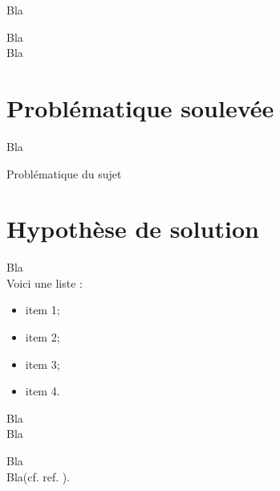 {}

Bla

Bla\\

Bla

\newpage

\section{Problématique soulevée}

Bla

\begin{center}
Problématique du sujet
\end{center}

\section{Hypothèse de solution}

Bla\\

Voici une liste :
\begin{itemize}
\item item 1;
\item item 2;
\item item 3;
\item item 4.
\end{itemize}

Bla\\

Bla

Bla\footnotemark\\

Bla(cf. ref. \cite{cite6}).

